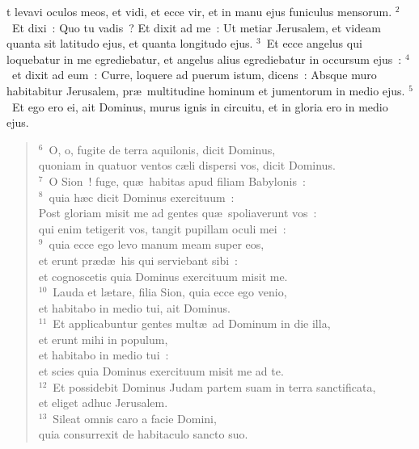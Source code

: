 \bchapter
{}t levavi oculos meos, et vidi, et ecce vir, et in manu ejus funiculus mensorum.
${}^{2}$~Et dixi~: Quo tu vadis~? Et dixit ad me~: Ut metiar Jerusalem, et videam quanta sit latitudo ejus, et quanta longitudo ejus.
${}^{3}$~Et ecce angelus qui loquebatur in me egrediebatur, et angelus alius egrediebatur in occursum ejus~:
${}^{4}$~et dixit ad eum~: Curre, loquere ad puerum istum, dicens~: Absque muro habitabitur Jerusalem, pr\ae\ multitudine hominum et jumentorum in medio ejus.
${}^{5}$~Et ego ero ei, ait Dominus, murus ignis in circuitu, et in gloria ero in medio ejus.
\begin{flushleft}\begin{verse}${}^{6}$~O, o, fugite de terra aquilonis, dicit Dominus,\\ quoniam in quatuor ventos c\ae li dispersi vos, dicit Dominus.\\
${}^{7}$~O Sion~! fuge, qu\ae\ habitas apud filiam Babylonis~:\\
${}^{8}$~quia h\ae c dicit Dominus exercituum~:\\ Post gloriam misit me ad gentes qu\ae\ spoliaverunt vos~:\\ qui enim tetigerit vos, tangit pupillam oculi mei~:\\
${}^{9}$~quia ecce ego levo manum meam super eos,\\ et erunt pr\ae d\ae\ his qui serviebant sibi~:\\ et cognoscetis quia Dominus exercituum misit me.\\
${}^{10}$~Lauda et l\ae tare, filia Sion, quia ecce ego venio,\\ et habitabo in medio tui, ait Dominus.\\
${}^{11}$~Et applicabuntur gentes mult\ae\ ad Dominum in die illa,\\ et erunt mihi in populum,\\ et habitabo in medio tui~:\\ et scies quia Dominus exercituum misit me ad te.\\
${}^{12}$~Et possidebit Dominus Judam partem suam in terra sanctificata,\\ et eliget adhuc Jerusalem.\\
${}^{13}$~Sileat omnis caro a facie Domini,\\ quia consurrexit de habitaculo sancto suo.\end{verse}\end{flushleft}



